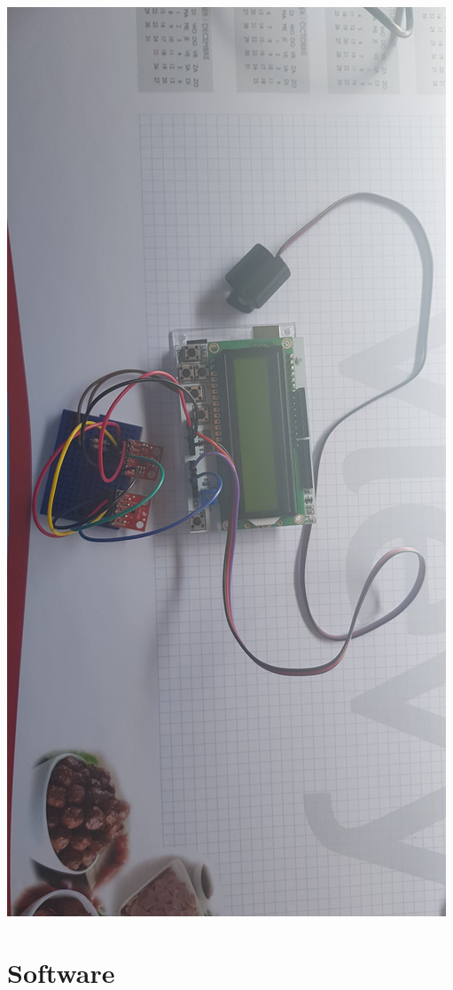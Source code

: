 \documentclass[a4paper]{report}
\begin{document}
        \includegraphics[width=\textwidth]{Fysieke_Voorstelling2}
    
\chapter{Software}
\end{document}
